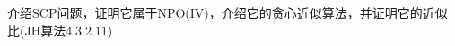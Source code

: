 \documentclass[a4paper, justified]{tufte-handout}
\begin{document}

\begin{ot}[SCP]
  介绍SCP问题，证明它属于NPO(IV)，介绍它的贪心近似算法，并证明它的近似比(JH算法4.3.2.11)
\end{ot}




% 




\beginfb

% 
% 
\end{document}
